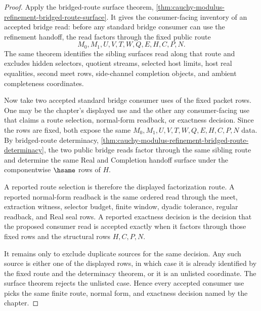 \begin{proof}
Apply the bridged-route surface theorem, \autoref{thm:cauchy-modulus-refinement-bridged-route-surface}. It gives the consumer-facing inventory of an accepted bridge read: before any standard bridge consumer can use the refinement handoff, the read factors through the fixed public route
$$
M_0,M_1,U,V,T,W,Q,E,H,C,P,N.
$$
The same theorem identifies the sibling surfaces read along that route and excludes hidden selectors, quotient streams, selected host limits, host real equalities, second meet rows, side-channel completion objects, and ambient completeness coordinates.

Now take two accepted standard bridge consumer uses of the fixed packet rows. One may be the chapter's displayed use and the other any consumer-facing use that claims a route selection, normal-form readback, or exactness decision. Since the rows are fixed, both expose the same $M_0,M_1,U,V,T,W,Q,E,H,C,P,N$ data. By bridged-route determinacy, \autoref{thm:cauchy-modulus-refinement-bridged-route-determinacy}, the two public bridge reads factor through the same sibling route and determine the same Real and Completion handoff surface under the componentwise $\hsame$ rows of $H$.

A reported route selection is therefore the displayed factorization route. A reported normal-form readback is the same ordered read through the meet, extraction witness, selector budget, finite window, dyadic tolerance, regular readback, and Real seal rows. A reported exactness decision is the decision that the proposed consumer read is accepted exactly when it factors through those fixed rows and the structural rows $H,C,P,N$.

It remains only to exclude duplicate sources for the same decision. Any such source is either one of the displayed rows, in which case it is already identified by the fixed route and the determinacy theorem, or it is an unlisted coordinate. The surface theorem rejects the unlisted case. Hence every accepted consumer use picks the same finite route, normal form, and exactness decision named by the chapter.
\end{proof}
